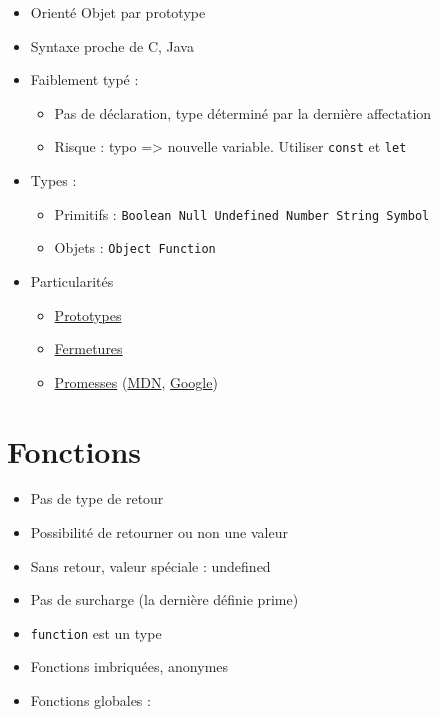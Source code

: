 \begin{itemize}
\tightlist
\item
  Orienté Objet par prototype
\item
  Syntaxe proche de C, Java
\item
  Faiblement typé :

  \begin{itemize}
  \tightlist
  \item
    Pas de déclaration, type déterminé par la dernière affectation
  \item
    Risque : typo =\textgreater{} nouvelle variable. Utiliser
    \textenglish{\texttt{const}} et \textenglish{\texttt{let}}
  \end{itemize}
\item
  Types :

  \begin{itemize}
  \tightlist
  \item
    Primitifs :
    \textenglish{\texttt{Boolean\ Null\ Undefined\ Number\ String\ Symbol}}
  \item
    Objets : \textenglish{\texttt{Object\ Function}}
  \end{itemize}
\item
  Particularités

  \begin{itemize}
  \tightlist
  \item
    \href{https://developer.mozilla.org/fr/docs/Web/JavaScript/Guide/Le_mod\%C3\%A8le_objet_JavaScript_en_d\%C3\%A9tails}{Prototypes}
  \item
    \href{http://www.w3schools.com/js/js_function_closures.asp}{Fermetures}
  \item
    \href{https://www.promisejs.org/}{Promesses}
    (\href{https://developer.mozilla.org/en/docs/Web/JavaScript/Reference/Global_Objects/Promise}{MDN},
    \href{https://developers.google.com/web/fundamentals/getting-started/primers/promises}{Google})
  \end{itemize}
\end{itemize}

\hypertarget{fonctions}{%
\section{Fonctions}\label{fonctions}}

\begin{itemize}
\tightlist
\item
  Pas de type de retour
\item
  Possibilité de retourner ou non une valeur
\item
  Sans retour, valeur spéciale : undefined
\item
  Pas de surcharge (la dernière définie prime)
\item
  \textenglish{\texttt{function}} est un type
\item
  Fonctions imbriquées, anonymes
\item
  Fonctions globales :
\end{itemize}

